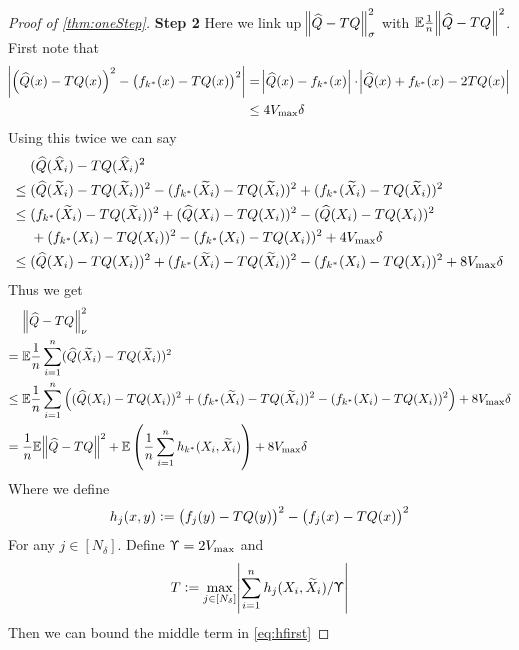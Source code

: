 \begin{proof}[Proof of \cref{thm:oneStep}]
  \textbf{Step 2} Here we link up $\norm{\widehat{Q} - TQ}_{\sigma}^2$ 
  with $\mathbb{E} \frac{1}{n} \norm{\widehat{Q} -TQ}^2$.
  First  note that
  \begin{align}
    \abs{ \left( \widehat{Q}(x) - TQ(x) \right)^2
    - \left( f_{k^*}(x) - TQ(x) \right)^2 }
    &= \abs{ \widehat{Q}(x) - f_{k^*}(x) } \cdot
    \abs{ \widehat{Q}(x) + f_{k^*}(x) - 2 TQ(x) }
    \\ & \leq 4 V_{\max} \delta
  \end{align}
  Using this twice we can say
  \begin{align}
    & (\widehat{Q}(\widehat{X}_i) - TQ(\widehat{X}_i)^2 
    \\ \leq {} & (\widehat{Q}(\widetilde{X}_i) - TQ(\widetilde{X}_i))^2
    - (f_{k^*}(\widetilde{X}_i) - TQ(\widetilde{X}_i))^2
    + (f_{k^*}(\widetilde{X}_i) - TQ(\widetilde{X}_i))^2 
    \\ \leq {} & (f_{k^*}(\widetilde{X}_i) - TQ(\widetilde{X}_i))^2 
    + (\widehat{Q}(X_i) - TQ(X_i))^2
    - (\widehat{Q}(X_i) - TQ(X_i))^2
    \notag \\ & + (f_{k^*}(X_i) - TQ(X_i))^2
    - (f_{k^*}(X_i) - TQ(X_i))^2 + 4 V_{\max} \delta
    \\ \leq {} & (\widehat{Q}(X_i) - TQ(X_i))^2
    + (f_{k^*}(\widetilde{X}_i) - TQ(\widetilde{X}_i))^2
    - (f_{k^*}(X_i) - TQ(X_i))^2
    + 8 V_{\max} \delta
    \label{eq:c2step2long1}
  \end{align}
  Thus we get
  \begin{align}
    & \norm{\widehat{Q} - TQ}_\nu^2
    \\ = {} & \mathbb{E} \frac{1}{n} \sum_{i=1}^n (\widehat{Q}(\widetilde{X}_i) - TQ(\widetilde{X}_i))^2
    \\ \leq {} & \mathbb{E} \frac{1}{n} \sum_{i=1}^n \left( (\widehat{Q}(X_i) - TQ(X_i))^2 
      + (f_{k^*}(\widetilde{X}_i) - TQ(\widetilde{X}_i))^2
    - (f_{k^*}(X_i) - TQ(X_i))^2 \right)
    + 8 V_{\max} \delta 
    \\ = {} & \frac{1}{n} \mathbb{E} \norm{\widehat{Q} - TQ}^2
    + \mathbb{E} \left( \frac{1}{n} \sum_{i=1}^n h_{k^*}(X_i, \widetilde{X}_i) \right)
    + 8 V_{\max} \delta
    \label{eq:hfirst}
  \end{align}
  Where we define
  \begin{equation}
    h_j(x, y) \vcentcolon= \left( f_j(y) - TQ(y) \right)^2
    - \left( f_j(x) - TQ(x) \right)^2
    \label{eq:c2step2hdef}
  \end{equation}
  For any $j \in [N_\delta]$.
  Define $\Upupsilon = 2 V_{\max}$ and
  \begin{equation}
    T \vcentcolon= \max_{j \in [N_\delta]}
    \abs{\sum_{i=1}^n h_j(X_i, \widetilde{X}_i)/ \Upupsilon}
  \end{equation}
  Then we can bound the middle term in \cref{eq:hfirst}

\end{proof}

